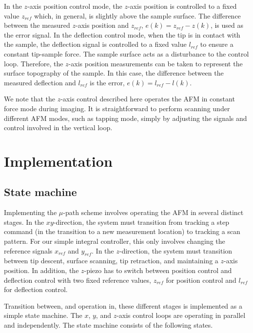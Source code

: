 \documentclass[twocolumn,twoside]{IEEEtran/IEEEtran}
\begin{document}
In the $z$-axis position control mode, the $z$-axis position is controlled to a
fixed value $z_{ref}$ which, in general, is slightly above the sample surface.
The difference between the measured $z$-axis position and $z_{ref}$,
${e(k) = z_{ref} - z(k)}$, is used as the error signal. In the deflection
control mode, when the tip is in contact with the sample, the deflection signal
is controlled to a fixed value $l_{ref}$ to ensure a constant tip-sample force.
The sample surface acts as a disturbance to the control loop. Therefore, the
$z$-axis position measurements can be taken to represent the surface topography
of the sample. In this case, the difference between the measured deflection and
$l_{ref}$ is the error, $e(k) = l_{ref} - l(k)$.
	
We note that the $z$-axis control described here operates the AFM in constant
force mode during imaging. It is straightforward to perform scanning under
different AFM modes, such as tapping mode, simply by adjusting the signals and
control involved in the vertical loop.

\section{Implementation}\label{sec:implementation}
	
\subsection{State machine}
Implementing the $\mu$-path scheme involves operating the AFM in several
distinct stages. In the $xy$-direction, the system must transition from tracking
a step command (in the transition to a new measurement location) to tracking a
scan pattern. For our simple integral controller, this only involves changing
the reference signals $x_{ref}$ and $y_{ref}$. In the $z$-direction, the system
must transition between tip descent, surface scanning, tip retraction, and
maintaining a $z$-axis position. In addition, the $z$-piezo has to switch
between position control and deflection control with two fixed reference values,
$z_{ref}$ for position control and $l_{ref}$ for deflection control.
	
Transition between, and operation in, these different stages is implemented as a
simple state machine. The $x$, $y$, and $z$-axis control loops are operating in
parallel and independently. The state machine consists of the following states.
\end{document}
